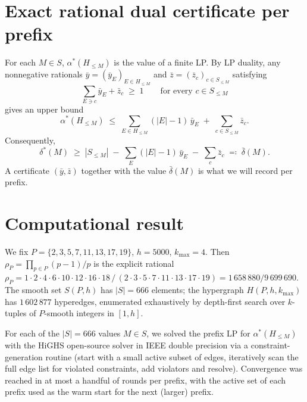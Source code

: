 \documentclass{amsart}
\begin{document}
\section*{Exact rational dual certificate per prefix}

For each $M \in S$, $\alpha^*(H_{\leq M})$ is the value of a finite LP. By
LP duality, any nonnegative rationals
$\bar{y} = (\bar{y}_E)_{E \in H_{\leq M}}$ and
$\bar{z} = (\bar{z}_c)_{c \in S_{\leq M}}$ satisfying
\begin{equation}\label{eq:dual-feas}
    \sum_{E \ni c} \bar{y}_E + \bar{z}_c \;\geq\; 1 \qquad \text{for every } c \in S_{\leq M}
\end{equation}
gives an upper bound
\[
    \alpha^*(H_{\leq M}) \;\leq\; \sum_{E \in H_{\leq M}} (|E| - 1)\, \bar{y}_E \;+\; \sum_{c \in S_{\leq M}} \bar{z}_c.
\]
Consequently,
\begin{equation}\label{eq:cert-deficit}
    \delta^*(M) \;\geq\; |S_{\leq M}| \;-\; \sum_{E} (|E|-1)\, \bar{y}_E \;-\; \sum_{c} \bar{z}_c
    \;\eqqcolon\; \bar{\delta}(M).
\end{equation}
A certificate $(\bar{y}, \bar{z})$ together with the value $\bar{\delta}(M)$ is what we will record per prefix.

\section*{Computational result}

We fix $P = \{2, 3, 5, 7, 11, 13, 17, 19\}$, $h = 5000$, $k_{\max} = 4$.
Then $\rho_P = \prod_{p \in P}(p-1)/p$ is the explicit rational
$\rho_P = 1 \cdot 2 \cdot 4 \cdot 6 \cdot 10 \cdot 12 \cdot 16 \cdot 18 \,/\, (2 \cdot 3 \cdot 5 \cdot 7 \cdot 11 \cdot 13 \cdot 17 \cdot 19) = 1\,658\,880/9\,699\,690$.
The smooth set $S(P, h)$ has $|S| = 666$ elements; the hypergraph
$H(P, h, k_{\max})$ has $1\,602\,877$ hyperedges, enumerated exhaustively
by depth-first search over $k$-tuples of $P$-smooth integers in $[1, h]$.

For each of the $|S| = 666$ values $M \in S$, we solved the prefix LP for
$\alpha^*(H_{\leq M})$ with the HiGHS open-source solver \cite{highs} in
IEEE double precision via a constraint-generation routine
(start with a small active subset of edges, iteratively scan the full
edge list for violated constraints, add violators and resolve). Convergence
was reached in at most a handful of rounds per prefix, with the active set
of each prefix used as the warm start for the next (larger) prefix.
\end{document}
